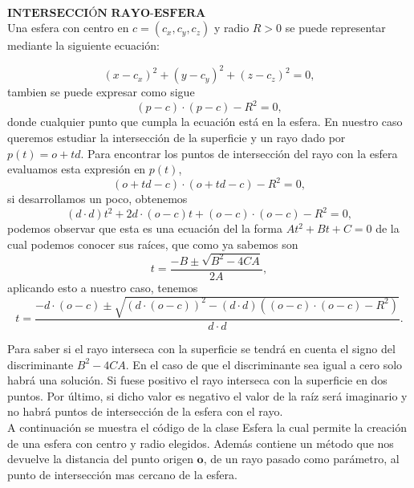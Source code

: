 ${ }$\\
$\textbf{INTERSECCIÓN RAYO-ESFERA}$
${ }$\\

Una esfera con centro en $c = (c_x, c_y, c_z)$ y radio $R>0$ se puede representar mediante la siguiente ecuación:

\[
	(x-c_x)^2 + (y-c_y)^2 + (z-c_z)^2 = 0,
\]
tambien se puede expresar como sigue
\[
	(p-c)\cdot(p-c) - R^2 = 0,
\]
donde cualquier punto que cumpla la ecuación está en la esfera. En nuestro caso queremos estudiar la intersección de la superficie y un rayo dado por $p(t) = o + td$. Para encontrar los puntos de intersección del rayo con la esfera evaluamos esta expresión en $p(t)$,
\[
	(o+td-c)\cdot(o+td-c) - R^2 = 0,
\]
si desarrollamos un poco, obtenemos
\[
	(d\cdot d)t^2 + 2d\cdot (o-c)t + (o-c)\cdot(o-c) - R^2 = 0,
\]
podemos observar que esta es una ecuación del la forma $At^2+Bt+C=0$ de la cual podemos conocer sus raíces, que como ya sabemos son
\[
	t = \frac{-B\pm \sqrt{B^2-4CA}}{2A},
\]
aplicando esto a nuestro caso, tenemos
\[
	t = \frac{-d\cdot (o-c) \pm \sqrt{(d\cdot (o-c))^2 - (d\cdot d)((o-c)\cdot(o-c)-R^2)}}{d\cdot d}.
\]

Para saber si el rayo interseca con la superficie se tendrá en cuenta el signo del discriminante $B^2-4CA$. En el caso de que el discriminante sea igual a cero solo habrá una solución. Si fuese positivo el rayo interseca con la superficie en dos puntos. Por último, si dicho valor es negativo el valor de la raíz será imaginario y no habrá puntos de intersección de la esfera con el rayo.
	${ }$\\	
	
A continuación se muestra el código de la clase Esfera la cual permite la creación de una esfera con centro y radio elegidos. Además contiene un método que nos devuelve la distancia del punto origen $\textbf{o}$, de un rayo pasado como parámetro, al punto de intersección mas cercano de la esfera.


